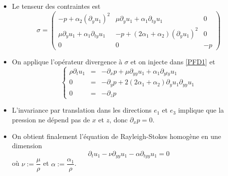 \begin{frame}
\begin{itemize}
    \item Le tenseur des contraintes est
\begin{equation*}
    \sigma = \begin{pmatrix}
        -p+\alpha_2(\partial_yu_1)^2 & \mu\partial_yu_1 + \alpha_1 \partial_{ty}u_1 & 0 \\
        \mu \partial_yu_1+\alpha_1\partial_{ty} u_1 & -p+(2\alpha_1+\alpha_2)(\partial_yu_1)^2 & 0 \\
        0 & 0 & -p
    \end{pmatrix}
\end{equation*} 
\item On applique l'opérateur divergence à $\sigma$ et on injecte dans \eqref{PFD1} et 
\begin{equation*}
    \left\{\begin{array}{rcl}
        \rho\partial_tu_1 & = & -\partial_xp + \mu \partial_{yy}u_1 + \alpha_1 \partial_{yty}u_1  \\
        0 & = & - \partial_yp+2(2\alpha_1+\alpha_2)\partial_yu_1\partial_{yy}u_1 \\
        0 & = & - \partial_zp
    \end{array}\right.
\end{equation*}
    \item L'invariance par translation dans les directions $e_1$ et $e_3$ implique que 
la pression ne dépend pas de $x$ et $z$, donc $\partial_xp=0$.
\item On obtient finalement l'équation de Rayleigh-Stokes homogène en une dimension
\begin{equation*}
    \partial_t u_1 - \nu \partial_{yy}u_1 - \alpha \partial_{tyy}u_1=0
\end{equation*}
où $\nu := \dfrac{\mu}{\rho}$ et $\alpha := \dfrac{\alpha_1}{\rho}$.
\end{itemize}
\end{frame}


